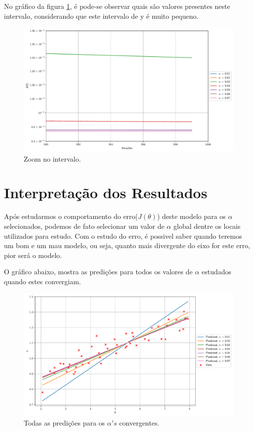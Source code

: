 \documentclass[a4paper, 12pt]{article}
\begin{document}
No gráfico da figura \ref{fig:max_zoom}, é pode-se observar quais são valores presentes neste intervalo, considerando
que este intervalo de y é muito pequeno.

\begin{figure}[!h]
    \centering
    \includegraphics[width=1\textwidth]{../imgs/max_zoom.pdf}
    \caption{Zoom no intervalo.}
    \label{fig:max_zoom}
\end{figure}
\clearpage

\section{Interpretação dos Resultados}
Após estudarmos o comportamento do erro($J(\theta)$) deste modelo para os $\alpha$ selecionados, podemos de fato
selecionar um valor de $\alpha$ global dentre os locais utilizados para estudo. Com o estudo do erro, é 
possivel saber quando teremos um bom e um mau modelo, ou seja, quanto mais divergente do eixo for este erro,
pior será o modelo. 

O gráfico abaixo, mostra as predições para todos os valores de $\alpha$ estudados quando estes convergiam. 

\begin{figure}[!h]
    \centering
    \includegraphics[width=1\textwidth]{../imgs/all_predictions.pdf}
    \caption{Todas as predições para os $\alpha's$ convergentes.}
    \label{fig:all_predictions}
\end{figure}
\clearpage
\end{document}
